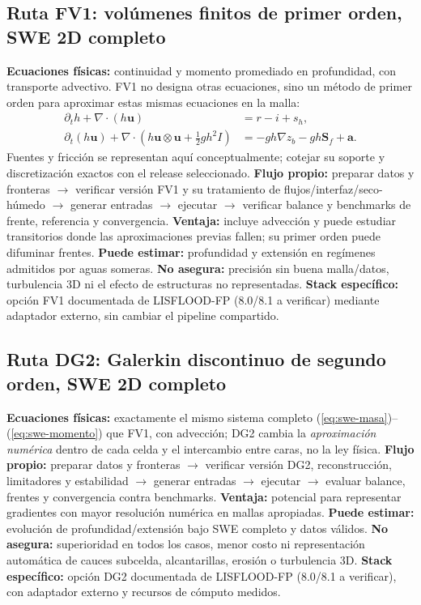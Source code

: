 \documentclass[11pt,a4paper]{article}
\begin{document}
\subsection{Ruta FV1: volúmenes finitos de primer orden, SWE 2D completo}
\textbf{Ecuaciones físicas:} continuidad y momento promediado en profundidad, con transporte advectivo. FV1 no designa otras ecuaciones, sino un método de primer orden para aproximar estas mismas ecuaciones en la malla:
\begin{align}
\partial_t h+\nabla\cdot(h\boldsymbol u)&=r-i+s_h,\label{eq:swe-masa}\\
\partial_t(h\boldsymbol u)+\nabla\cdot\left(h\boldsymbol u\otimes\boldsymbol u+\tfrac12 gh^2 I\right)&=-gh\nabla z_b-gh\boldsymbol S_f+\boldsymbol a.\label{eq:swe-momento}
\end{align}
Fuentes y fricción se representan aquí conceptualmente; cotejar su soporte y discretización exactos con el release seleccionado. \textbf{Flujo propio:} preparar datos y fronteras $\rightarrow$ verificar versión FV1 y su tratamiento de flujos/interfaz/seco-húmedo $\rightarrow$ generar entradas $\rightarrow$ ejecutar $\rightarrow$ verificar balance y benchmarks de frente, referencia y convergencia. \textbf{Ventaja:} incluye advección y puede estudiar transitorios donde las aproximaciones previas fallen; su primer orden puede difuminar frentes. \textbf{Puede estimar:} profundidad y extensión en regímenes admitidos por aguas someras. \textbf{No asegura:} precisión sin buena malla/datos, turbulencia 3D ni el efecto de estructuras no representadas. \textbf{Stack específico:} opción FV1 documentada de LISFLOOD-FP (8.0/8.1 a verificar) mediante adaptador externo, sin cambiar el pipeline compartido.

\subsection{Ruta DG2: Galerkin discontinuo de segundo orden, SWE 2D completo}
\textbf{Ecuaciones físicas:} exactamente el mismo sistema completo (\ref{eq:swe-masa})--(\ref{eq:swe-momento}) que FV1, con advección; DG2 cambia la \emph{aproximación numérica} dentro de cada celda y el intercambio entre caras, no la ley física. \textbf{Flujo propio:} preparar datos y fronteras $\rightarrow$ verificar versión DG2, reconstrucción, limitadores y estabilidad $\rightarrow$ generar entradas $\rightarrow$ ejecutar $\rightarrow$ evaluar balance, frentes y convergencia contra benchmarks. \textbf{Ventaja:} potencial para representar gradientes con mayor resolución numérica en mallas apropiadas. \textbf{Puede estimar:} evolución de profundidad/extensión bajo SWE completo y datos válidos. \textbf{No asegura:} superioridad en todos los casos, menor costo ni representación automática de cauces subcelda, alcantarillas, erosión o turbulencia 3D. \textbf{Stack específico:} opción DG2 documentada de LISFLOOD-FP (8.0/8.1 a verificar), con adaptador externo y recursos de cómputo medidos.
\end{document}
